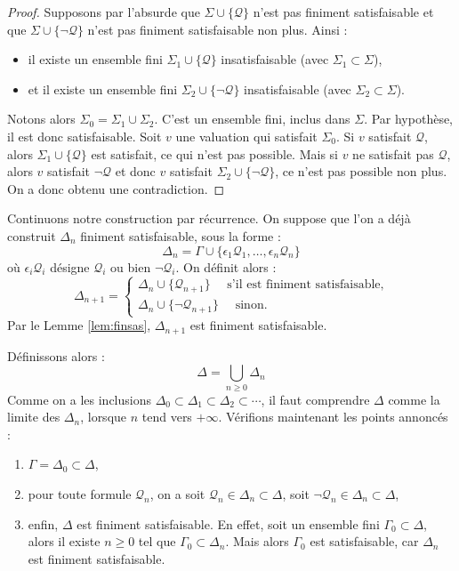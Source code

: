 \documentclass[11pt,class=report,crop=false]{standalone}
\begin{document}
	\begin{proof}
	Supposons par l'absurde que $\Sigma \cup \{ \mathcal{Q} \}$ n'est pas finiment satisfaisable 
	et que $\Sigma \cup \{ \lnot\mathcal{Q} \}$ n'est pas finiment satisfaisable non plus.
	Ainsi : 
	\begin{itemize}
		\item il existe un ensemble fini $\Sigma_1 \cup \{ \mathcal{Q} \}$ insatisfaisable (avec $\Sigma_1 \subset \Sigma$),
		
		\item et il existe un ensemble fini $\Sigma_2 \cup \{ \lnot \mathcal{Q} \}$ insatisfaisable (avec $\Sigma_2 \subset \Sigma$).
	\end{itemize}
	 
	Notons alors $\Sigma_0 = \Sigma_1 \cup \Sigma_2$. C'est un ensemble fini, inclus dans $\Sigma$. 
	Par hypothèse, il est donc satisfaisable. Soit $v$ une valuation qui satisfait $\Sigma_0$.
	Si $v$ satisfait $\mathcal{Q}$, alors $\Sigma_1 \cup \{ \mathcal{Q} \}$ est satisfait, ce qui n'est pas possible.
	Mais si $v$ ne satisfait pas $\mathcal{Q}$, alors $v$ satisfait $\lnot \mathcal{Q}$ et donc $v$ satisfait $\Sigma_2 \cup \{ \lnot \mathcal{Q} \}$, ce n'est pas possible non plus. 
	On a donc obtenu une contradiction.
	\end{proof}


\medskip

Continuons notre construction par récurrence. On suppose que l'on a déjà construit $\Delta_n$ finiment satisfaisable, sous la forme :
\[
\Delta_n = \Gamma \cup \{ \epsilon_1 \mathcal{Q}_1, \ldots, \epsilon_n \mathcal{Q}_n \}
\]
où $\epsilon_i \mathcal{Q}_i$ désigne $\mathcal{Q}_i$ ou bien $\lnot \mathcal{Q}_i$.
On définit alors :
\[
\Delta_{n+1} = \left\lbrace 
	\begin{array}{l}
	\Delta_n \cup \{ \mathcal{Q}_{n+1} \} \quad \text{ s'il est finiment satisfaisable,} \\
	\Delta_n \cup \{ \lnot\mathcal{Q}_{n+1} \} \quad \text{ sinon.}
	\end{array}
\right.
\]
Par le Lemme \ref{lem:finsas}, $\Delta_{n+1}$ est finiment satisfaisable.


\medskip


Définissons alors :
\[
	\Delta = \bigcup_{n \ge 0} \Delta_n
\]
Comme on a les inclusions $\Delta_0 \subset \Delta_1 \subset \Delta_2 \subset \cdots$, il faut comprendre $\Delta$ comme la limite des $\Delta_n$, lorsque $n$ tend vers $+\infty$.
Vérifions maintenant les points annoncés :
\begin{enumerate}
	\item $\Gamma = \Delta_0 \subset \Delta$,

	\item pour toute formule $\mathcal{Q}_n$, on a soit $\mathcal{Q}_n \in \Delta_n \subset \Delta$, soit $\lnot \mathcal{Q}_n \in \Delta_n \subset \Delta$,

	\item enfin, $\Delta$ est finiment satisfaisable. En effet, soit un ensemble fini $\Gamma_0 \subset \Delta$, alors il existe $n \ge 0$ tel que $\Gamma_0 \subset \Delta_n$.
	Mais alors $\Gamma_0$ est satisfaisable, car $\Delta_n$ est finiment satisfaisable.
\end{enumerate}	
\end{document}
